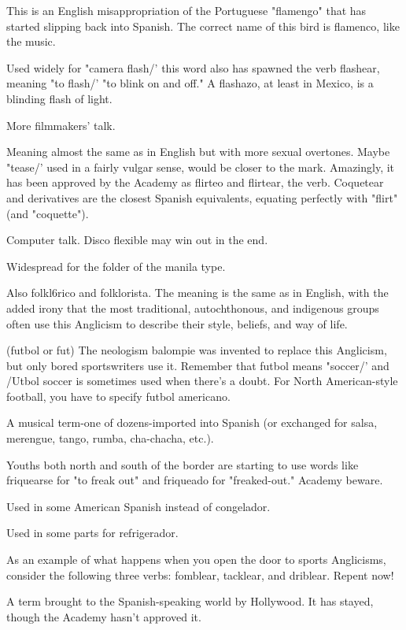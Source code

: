  This is an English misappropriation of the Portuguese "flamengo" that has started slipping back into Spanish. The correct name of this bird is flamenco, like the music.

 Used widely for "camera flash/' this word also has
spawned the verb flashear, meaning "to flash/' "to blink on and off."
A flashazo, at least in Mexico, is a blinding flash of light.

 More filmmakers' talk.

 Meaning almost the same as in English but with more
sexual overtones. Maybe "tease/' used in a fairly vulgar sense, would be
closer to the mark. Amazingly, it has been approved by the Academy as
flirteo and flirtear, the verb. Coquetear and derivatives are the closest
Spanish equivalents, equating perfectly with "flirt" (and "coquette").

 Computer talk. Disco flexible may win out in the end.

 Widespread for the folder of the manila type.

 Also folkl6rico and folklorista. The meaning is
the same as in English, with the added irony that the most traditional,
autochthonous, and indigenous groups often use this Anglicism to describe their style, beliefs, and way of life.

 (futbol or fut) The neologism balompie was invented to replace this Anglicism, but only bored sportswriters use it.
Remember that futbol means "soccer/' and /Utbol soccer is sometimes
used when there's a doubt. For North American-style football, you
have to specify futbol americano.

 A musical term-one of dozens-imported into
Spanish (or exchanged for salsa, merengue, tango, rumba, cha-chacha, etc.).

 Youths both north and south of the border are starting to use words like friquearse for "to freak out" and friqueado for
"freaked-out." Academy beware.

 Used in some American Spanish instead of
congelador.

 Used in some parts for refrigerador.

 As an example of what happens when you open the
door to sports Anglicisms, consider the following three verbs: fomblear, tacklear, and driblear. Repent now!

 A term brought to the Spanish-speaking world by
Hollywood. It has stayed, though the Academy hasn't approved it.

